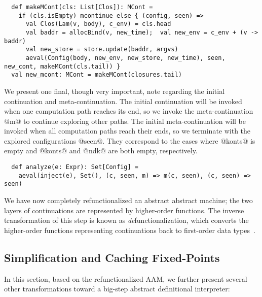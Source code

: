 \documentclass[acmsmall, screen]{acmart}\settopmatter{}
\begin{document}
\begin{lstlisting}
  def makeMCont(cls: List[Clos]): MCont =
    if (cls.isEmpty) mcontinue else { (config, seen) =>
      val Clos(Lam(v, body), c_env) = cls.head
      val baddr = allocBind(v, new_time);  val new_env = c_env + (v -> baddr)
      val new_store = store.update(baddr, argvs)
      aeval(Config(body, new_env, new_store, new_time), seen, new_cont, makeMCont(cls.tail)) }
  val new_mcont: MCont = makeMCont(closures.tail)
\end{lstlisting}

We present one final, though very important, note regarding the initial continuation and meta-continuation.
The initial continuation will be invoked when one computation path reaches its end,
so we invoke the meta-continuation @m@ to continue exploring other paths.
The initial meta-continuation will be invoked when all computation paths reach their ends,
so we terminate with the explored configurations @seen@. They correspond to the
cases where @konts@ is empty and @konts@ and @ndk@ are both empty, respectively.

\begin{lstlisting}
  def analyze(e: Expr): Set[Config] =
    aeval(inject(e), Set(), (c, seen, m) => m(c, seen), (c, seen) => seen)
\end{lstlisting}

We have now completely refunctionalized an abstract abstract machine; the two layers
of continuations are represented by higher-order functions. The inverse transformation
of this step is known as \textit{de}functionalization, which converts the higher-order functions
representing continuations back to first-order data
types~\cite{Danvy:2001:DW:773184.773202, Danvy:2008:DIP:1411204.1411206}.

\subsection{Simplification and Caching Fixed-Points}

In this section, based on the refunctionalized AAM, we
further present several other transformations toward a big-step abstract
definitional interpreter:
\end{document}
